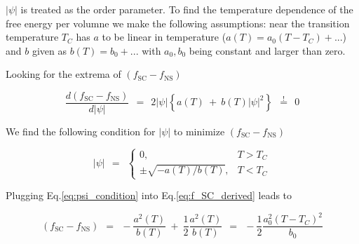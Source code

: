 \documentclass[10pt]{report}
\numberwithin{equation}{chapter}
\newcommand{\myEq}[1]{
  Eq.\ref{#1}
}
\begin{document}
$|\psi|$ is treated as the order parameter. 
To find the temperature dependence of the free energy per volumne we make the following assumptions: near the transition temperature $T_C$ has $a$ to be linear in temperature ($a(T)=a_0(T-T_C) +...$) and $b$ given as $b(T)=b_0+...$ with $a_0, b_0$ being constant and larger than zero.

Looking for the extrema of $(f_\text{SC}-f_\text{NS})$

\begin{equation} \label{eq:f_SC_derived}
  \frac{d (f_\text{SC}-f_\text{NS})}{d|\psi|} ~~=~~ 2|\psi| \left\{a(T) ~+~ b(T)|\psi|^2  \right\} 
  ~~\overset{!}{=}~~ 0
\end{equation}

We find the following condition for $|\psi|$ to minimize $(f_\text{SC}-f_\text{NS})$

\begin{equation} \label{eq:psi_condition}
  |\psi| ~~=~~ \left\{ 
  \begin{array}{cr}
    0, & T>T_C\\
    \pm \sqrt{-a(T)/b(T)}, & T<T_C
  \end{array} \right.
\end{equation}

Plugging \myEq{eq:psi_condition} into \myEq{eq:f_SC_derived} leads to

\begin{equation}
  (f_\text{SC} - f_\text{NS}) ~~=~~ -\frac{a^2(T)}{b(T)} ~+~ \frac{1}{2} \frac{a^2(T)}{b(T)} ~~=~~
  -\frac{1}{2} \frac{a_0^2(T-T_C)^2}{b_0}
\end{equation}
\end{document}
